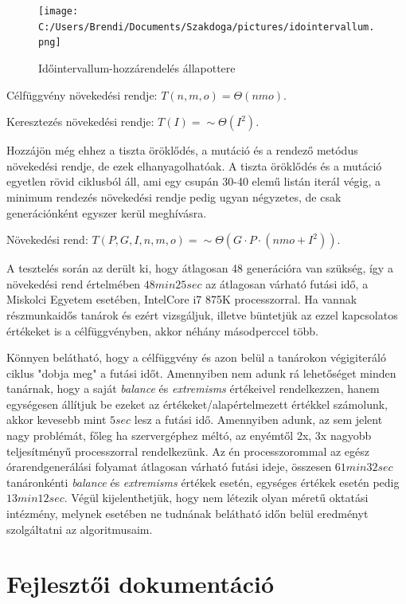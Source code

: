 \documentclass[12pt,a4paper]{report}
\begin{document}
\begin{figure}
\texttt{[image: C:/Users/Brendi/Documents/Szakdoga/pictures/idointervallum.png]}
\caption{Időintervallum-hozzárendelés állapottere}
\end{figure}

Célfüggvény növekedési rendje: $T(n,m,o)=\Theta(nmo)$.

Keresztezés növekedési rendje: $T(I)=\sim \Theta(I^2)$.

Hozzájön még ehhez a tiszta öröklődés, a mutáció és a rendező metódus növekedési rendje, de ezek elhanyagolhatóak. A tiszta öröklődés és a mutáció egyetlen rövid ciklusból áll, ami egy csupán 30-40 elemű listán iterál végig, a minimum rendezés növekedési rendje pedig ugyan négyzetes, de csak generációnként egyszer kerül meghívásra.

Növekedési rend: $T(P,G,I,n,m,o)=\sim \Theta(G \cdot P \cdot (nmo+I^2))$.

A tesztelés során az derült ki, hogy átlagosan 48 generációra van szükség, így a növekedési rend értelmében $48min 25sec$ az átlagosan várható futási idő, a Miskolci Egyetem esetében, IntelCore i7 875K processzorral. Ha vannak részmunkaidős tanárok és ezért vizsgáljuk, illetve büntetjük az ezzel kapcsolatos értékeket is a célfüggvényben, akkor néhány másodperccel több.

Könnyen belátható, hogy a célfüggvény és azon belül a tanárokon végigiteráló ciklus "dobja meg" a futási időt. Amennyiben nem adunk rá lehetőséget minden tanárnak, hogy a saját \textsl{balance} és \textsl{extremisms} értékeivel rendelkezzen, hanem egységesen állítjuk be ezeket az értékeket/alapértelmezett értékkel számolunk, akkor kevesebb mint $5 sec$ lesz a futási idő. Amennyiben adunk, az sem jelent nagy problémát, főleg ha szervergéphez méltó, az enyémtől 2x, 3x nagyobb teljesítményű processzorral rendelkezünk. Az én processzorommal az egész órarendgenerálási folyamat átlagosan várható futási ideje, összesen $61min 32sec$ tanáronkénti \textsl{balance} és \textsl{extremisms} értékek esetén, egységes értékek esetén pedig $13min 12sec$. Végül kijelenthetjük, hogy nem létezik olyan méretű oktatási intézmény, melynek esetében ne tudnának belátható időn belül eredményt szolgáltatni az algoritmusaim.

\newpage

\section{Fejlesztői dokumentáció}
\end{document}
